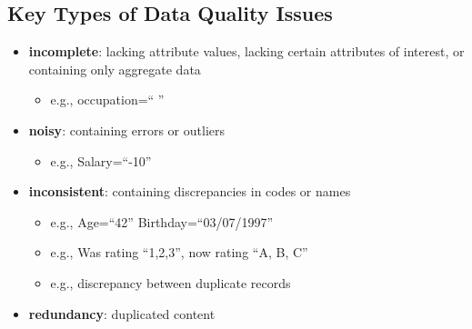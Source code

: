 \documentclass[11pt]{article}
\theoremstyle{definition}
\begin{document}
\subsection{Key Types of Data Quality Issues}
\begin{itemize}
    \item \textbf{incomplete}: lacking attribute values, lacking certain attributes
    of interest, or containing only aggregate data
    \begin{itemize}
        \item e.g., occupation=“ ”
    \end{itemize}
    \item \textbf{noisy}: containing errors or outliers
    \begin{itemize}
        \item e.g., Salary=“-10”
    \end{itemize}
    \item \textbf{inconsistent}: containing discrepancies in codes or names
    \begin{itemize}
        \item e.g., Age=“42” Birthday=“03/07/1997”
        \item e.g., Was rating “1,2,3”, now rating “A, B, C”
        \item e.g., discrepancy between duplicate records
    \end{itemize}
    \item \textbf{redundancy}: duplicated content
\end{itemize}
\end{document}
